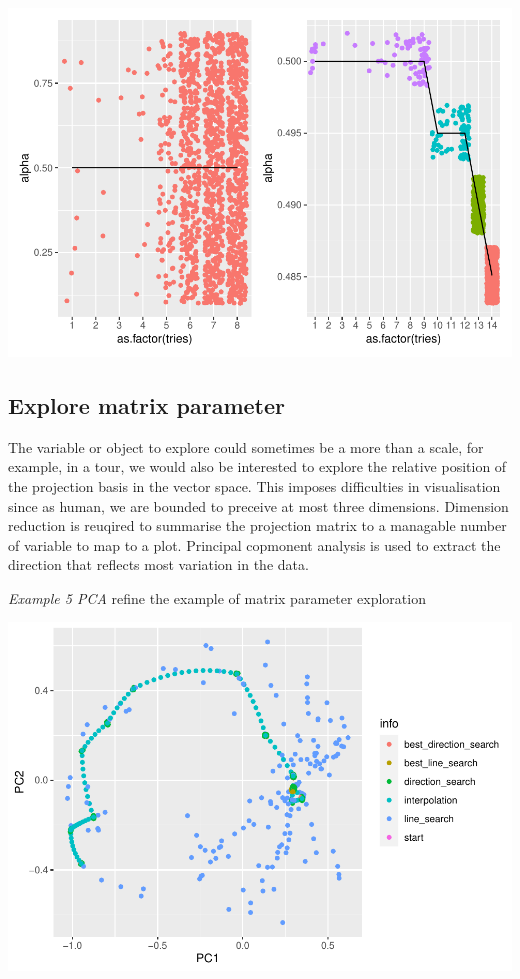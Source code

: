 \documentclass[12pt]{article}
\newenvironment{Shaded}{\begin{snugshade}}{\end{snugshade}}
\newcommand{\DataTypeTok}[1]{\textcolor[rgb]{0.13,0.29,0.53}{#1}}
\newcommand{\KeywordTok}[1]{\textcolor[rgb]{0.13,0.29,0.53}{\textbf{#1}}}
\newcommand{\NormalTok}[1]{#1}
\newcommand{\OperatorTok}[1]{\textcolor[rgb]{0.81,0.36,0.00}{\textbf{#1}}}
\newcommand{\StringTok}[1]{\textcolor[rgb]{0.31,0.60,0.02}{#1}}
\begin{document}
\includegraphics{paper_files/figure-latex/alpha-1.pdf}

\hypertarget{explore-matrix-parameter}{%
\subsection{Explore matrix parameter}\label{explore-matrix-parameter}}

The variable or object to explore could sometimes be a more than a
scale, for example, in a tour, we would also be interested to explore
the relative position of the projection basis in the vector space. This
imposes difficulties in visualisation since as human, we are bounded to
preceive at most three dimensions. Dimension reduction is reuqired to
summarise the projection matrix to a managable number of variable to map
to a plot. Principal copmonent analysis is used to extract the direction
that reflects most variation in the data.

\emph{Example 5 PCA} refine the example of matrix parameter exploration

\begin{Shaded}
\end{Shaded}

\includegraphics{paper_files/figure-latex/pca-1.pdf}
\end{document}
